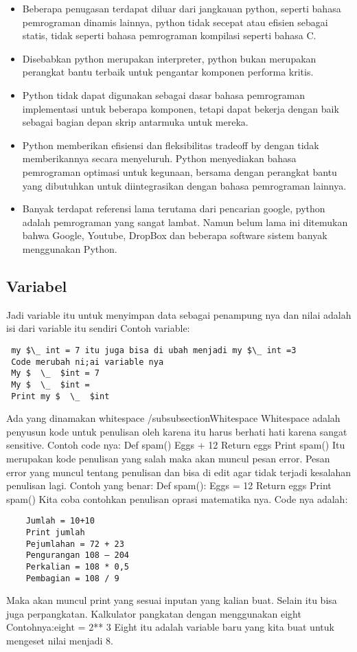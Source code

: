 	\begin{itemize}
		\item Beberapa penugasan terdapat diluar dari jangkauan python, seperti bahasa pemrograman dinamis lainnya, python tidak secepat atau eﬁsien sebagai statis, tidak seperti bahasa pemrograman kompilasi seperti bahasa C. 
		\item Disebabkan python merupakan interpreter, python bukan merupakan perangkat bantu terbaik untuk pengantar komponen performa kritis. 
		\item Python tidak dapat digunakan sebagai dasar bahasa pemrograman implementasi untuk beberapa komponen, tetapi dapat bekerja dengan baik sebagai bagian depan skrip antarmuka untuk mereka. 
		\item Python memberikan eﬁsiensi dan ﬂeksibilitas tradeoff by dengan tidak memberikannya secara menyeluruh. Python menyediakan bahasa pemrograman optimasi untuk kegunaan, bersama dengan perangkat bantu yang dibutuhkan untuk diintegrasikan dengan bahasa pemrograman lainnya.
		\item Banyak terdapat referensi lama terutama dari pencarian google, python adalah pemrograman yang sangat lambat. Namun belum lama ini ditemukan bahwa Google, Youtube, DropBox dan beberapa software sistem banyak menggunakan Python.
	\end{itemize}
	
 \subsection{Variabel}
 Jadi variable itu untuk menyimpan data sebagai penampung nya dan nilai adalah isi dari variable itu sendiri 
 Contoh variable:
 \begin{verbatim}
 my $\_ int = 7 itu juga bisa di ubah menjadi my $\_ int =3  
 Code merubah ni;ai variable nya 
 My $  \_  $int = 7 
 My $  \_  $int = 
 Print my $  \_  $int
 \end{verbatim}
 Ada yang dinamakan whitespace  
/subsubsection{Whitespace}
Whitespace adalah penyusun kode untuk penulisan oleh karena itu harus berhati hati karena sangat sensitive.
Contoh code nya:
	Def spam() 
	Eggs + 12 
	Return eggs 
	Print spam() 
Itu merupakan kode penulisan yang salah maka akan muncul pesan error.
Pesan error yang muncul tentang penulisan dan bisa di edit agar tidak terjadi kesalahan penulisan lagi. 
Contoh yang benar: 
	Def spam(): 
	Eggs = 12 
	Return eggs 
	Print spam() 
Kita coba contohkan penulisan oprasi matematika nya. 
Code nya adalah:
\begin{verbatim}
	Jumlah = 10+10 
	Print jumlah 
	Pejumlahan = 72 + 23 
	Pengurangan 108 – 204 
	Perkalian = 108 * 0,5 
	Pembagian = 108 / 9
\end{verbatim}
Maka akan muncul print yang sesuai inputan yang kalian buat.
Selain itu bisa juga perpangkatan. Kalkulator pangkatan dengan menggunakan eight
Contohnya:eight = 2** 3 
Eight itu adalah variable baru yang kita buat untuk mengeset nilai menjadi 8.

